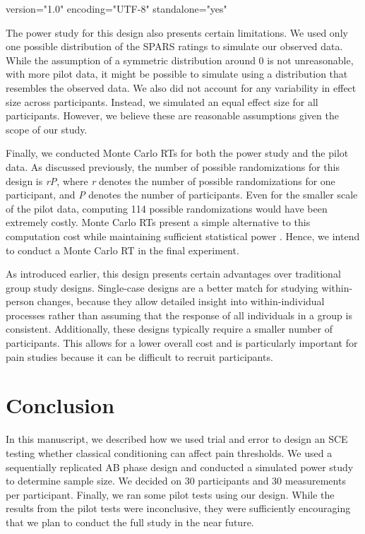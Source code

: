 version="1.0" encoding="UTF-8" standalone="yes" \documentclass{article}
\begin{document}
The power study for this design also presents certain limitations. We used only one possible distribution of the SPARS ratings to simulate our observed data. While the assumption of a symmetric distribution around 0 is not unreasonable, with more pilot data, it might be possible to simulate using a distribution that resembles the observed data. We also did not account for any variability in effect size across participants. Instead, we simulated an equal effect size for all participants. However, we believe these are reasonable assumptions given the scope of our study. 

Finally, we conducted Monte Carlo RTs for both the power study and the pilot data. As discussed previously, the number of possible randomizations for this design is \emph{r}\emph{P}, where \emph{r} denotes the number of possible randomizations for one participant, and \emph{P} denotes the number of participants. Even for the smaller scale of the pilot data, computing 114 possible randomizations would have been extremely costly. Monte Carlo RTs present a simple alternative to this computation cost while maintaining sufficient statistical power \autocite{bib(Edgington1969,bibHope1968)}. Hence, we intend to conduct a Monte Carlo RT in the final experiment.

As introduced earlier, this design presents certain advantages over traditional group study designs. Single-case designs are a better match for studying within-person changes, because they allow detailed insight into within-individual processes rather than assuming that the response of all individuals in a group is consistent. Additionally, these designs typically require a smaller number of participants. This allows for a lower overall cost and is particularly important for pain studies because it can be difficult to recruit participants.

\section{Conclusion}

In this manuscript, we described how we used trial and error to design an SCE testing whether classical conditioning can affect pain thresholds. We used a sequentially replicated AB phase design and conducted a simulated power study to determine sample size. We decided on 30 participants and 30 measurements per participant. Finally, we ran some pilot tests using our design. While the results from the pilot tests were inconclusive, they were sufficiently encouraging that we plan to conduct the full study in the near future.
\end{document}
